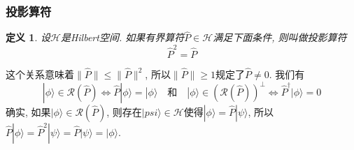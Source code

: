 \documentclass[a4paper,11pt]{article}
\newtheorem{definition}{\hspace{2em}定义}[section]
\begin{document}
\subsubsection{投影算符}
\begin{definition}
  设$\mathcal{H}$是Hilbert空间. 如果有界算符$\hat{P}\in\mathcal{H}$满足下面条件, 则叫做投影算符
\begin{equation*}
  \hat{P}^2=\hat{P}
\end{equation*}
\end{definition}
这个关系意味着$\|\hat{P}\|\leq\|\hat{P}\|^2$, 所以$\|\hat{P}\|\geq1$规定了$\hat{P}\neq
0$. 我们有
\begin{equation}\label{projection operator}
  |\phi\rangle\in\mathcal{R}(\hat{P})\Longleftrightarrow\hat{P}|\phi\rangle=|\phi\rangle\quad\text{和}\quad|\phi\rangle\in(\mathcal{R}(\hat{P}))^{\perp}\Longleftrightarrow\hat{P}^{\dag}|\phi\rangle=0
\end{equation}
确实, 如果$|\phi\rangle\in\mathcal{R}(\hat{P})$, 则存在$|psi\rangle\in\mathcal{H}$使得$|\phi\rangle=\hat{P}|\psi\rangle$, 所以$\hat{P}|\phi\rangle=\hat{P}^2|\psi\rangle=\hat{P}|\psi\rangle=|\phi\rangle$.
\end{document}
